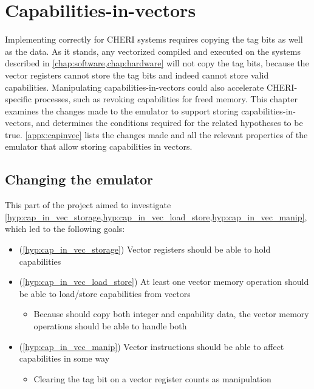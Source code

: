 \documentclass[../thesis]{subfiles}
\begin{document}
\chapter{Capabilities-in-vectors\label{chap:capinvec}}
Implementing  correctly for CHERI systems requires copying the tag bits as well as the data.
As it stands, any vectorized  compiled and executed on the systems described in \cref{chap:software,chap:hardware} will not copy the tag bits, because the vector registers cannot store the tag bits and indeed cannot store valid capabilities.
Manipulating capabilities-in-vectors could also accelerate CHERI-specific processes, such as revoking capabilities for freed memory\cite{xiaCHERIvokeCharacterisingPointer2019}.
This chapter examines the changes made to the emulator to support storing capabilities-in-vectors, and determines the conditions required for the related hypotheses to be true.
\cref{appx:capinvec} lists the changes made and all the relevant properties of the emulator that allow storing capabilities in vectors.

\section{Changing the emulator}
This part of the project aimed to investigate \cref{hyp:cap_in_vec_storage,hyp:cap_in_vec_load_store,hyp:cap_in_vec_manip}, which led to the following goals:
\begin{itemize}
    \item (\cref{hyp:cap_in_vec_storage}) Vector registers should be able to hold capabilities 
    \item (\cref{hyp:cap_in_vec_load_store}) At least one vector memory operation should be able to load/store capabilities from vectors
    \begin{itemize}
        \item Because  should copy both integer and capability data, the vector memory operations should be able to handle both
    \end{itemize}
    \item (\cref{hyp:cap_in_vec_manip}) Vector instructions should be able to affect capabilities in some way
    \begin{itemize}
        \item Clearing the tag bit on a vector register counts as manipulation
    \end{itemize}
\end{itemize}
\end{document}
